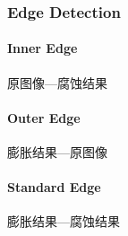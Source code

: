 \documentclass[
]{article}
\begin{document}
\hypertarget{header-n50}{%
\subsubsection{Edge Detection}\label{header-n50}}

\hypertarget{header-n51}{%
\paragraph{Inner Edge}\label{header-n51}}

原图像---腐蚀结果

\hypertarget{header-n53}{%
\paragraph{Outer Edge}\label{header-n53}}

膨胀结果---原图像

\hypertarget{header-n55}{%
\paragraph{Standard Edge}\label{header-n55}}

膨胀结果---腐蚀结果
\end{document}
